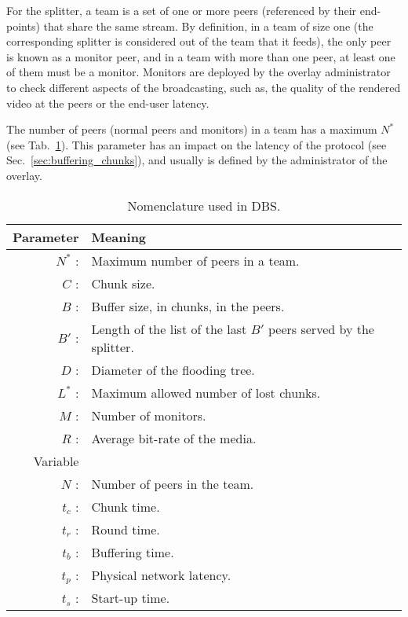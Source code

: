 

\label{sec:team_def}

For the splitter, a team is a set of one or more peers (referenced by
their end-points) that share the same stream. By definition, in a team
of size one (the corresponding splitter is considered out of the team
that it feeds), the only peer is known as a \gls{monitor} peer, and in
a team with more than one peer, at least one of them must be a
monitor. Monitors are deployed by the overlay administrator to
check different aspects of the broadcasting, such as, the quality of
the rendered video at the peers or the end-user latency.

The number of peers (normal peers and monitors) in a team has a
maximum $N^*$ (see Tab.~\ref{tab:DBS_nomenclature}). This parameter
has an impact on the latency of the protocol (see
Sec.~\ref{sec:buffering_chunks}), and usually is defined by the
administrator of the overlay.

\begin{table}[hbt]
  \centering
  \begin{tabular}{rl}
    Parameter & Meaning \\
    \hline
    $N^*$ :  & Maximum number of peers in a team. \\
    $C$ :    & Chunk size. \\
    $B$ :    & Buffer size, in chunks, in the peers. \\
    $B'$ :   & Length of the list of the last $B'$ peers served by the splitter. \\ 
    $D$ :    & Diameter of the flooding tree. \\
    $L^*$ :  & Maximum allowed number of lost chunks. \\
    $M$ :    & Number of monitors. \\
    $R$ :    & Average bit-rate of the media. \\
    Variable & \\
    \hline
    $N$ :    & Number of peers in the team. \\
    $t_c$ :  & Chunk time. \\
    $t_r$ :  & Round time. \\
    $t_b$ :  & Buffering time. \\
    $t_p$ :  & Physical network latency. \\
    $t_s$ :  & Start-up time.
  \end{tabular}
  \caption{Nomenclature used in DBS.} %
  \label{tab:DBS_nomenclature}
\end{table}

